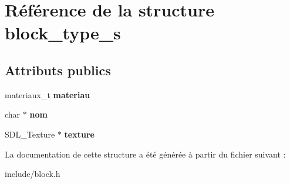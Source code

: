 \hypertarget{structblock__type__s}{}\section{Référence de la structure block\+\_\+type\+\_\+s}
\label{structblock__type__s}
\subsection*{Attributs publics}
\begin{DoxyCompactItemize}
\item 
\mbox{\label{structblock__type__s_a30b543f560da9d156660a4fd0724ec63}} 
materiaux\+\_\+t {\bfseries materiau}
\item 
\mbox{\label{structblock__type__s_a24270b040acbfe41f41cd3a84ff75b3b}} 
char $\ast$ {\bfseries nom}
\item 
\mbox{\label{structblock__type__s_af0d84f06789f50f2810a5d9b48f65b2a}} 
S\+D\+L\+\_\+\+Texture $\ast$ {\bfseries texture}
\end{DoxyCompactItemize}


La documentation de cette structure a été générée à partir du fichier suivant \+:\begin{DoxyCompactItemize}
\item 
include/block.\+h\end{DoxyCompactItemize}
